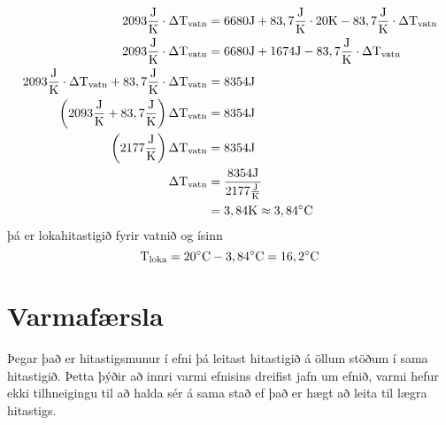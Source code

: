 \begin{formalexample}
\begin{align*}
	2093 \frac{\textrm{J}}{\text{K}} \cdot \Delta \text{T}_\text{vatn}
		&= 6680 \textrm{J} +  83,7 \frac{\textrm{J}}{\text{K}} \cdot 20 \text{K} - 83,7 \frac{\textrm{J}}{\text{K}} \cdot \Delta \text{T}_\text{vatn}\\
	2093 \frac{\textrm{J}}{\text{K}} \cdot \Delta \text{T}_\text{vatn}
		&= 6680 \textrm{J} +  1674 \textrm{J} - 83,7 \frac{\textrm{J}}{\text{K}} \cdot \Delta \text{T}_\text{vatn} \\
	2093 \frac{\textrm{J}}{\text{K}} \cdot \Delta \text{T}_\text{vatn} + 83,7 \frac{\textrm{J}}{\text{K}} \cdot \Delta \text{T}_\text{vatn}
		&= 8354 \textrm{J} \\
	\left( 2093 \frac{\textrm{J}}{\text{K}} + 83,7 \frac{\textrm{J}}{\text{K}} \right) \Delta \text{T}_\text{vatn}
		&= 8354 \textrm{J} \\
	\left( 2177 \frac{\textrm{J}}{\text{K}} \right) \Delta \text{T}_\text{vatn}
		&= 8354 \textrm{J} \\
	\Delta \text{T}_\text{vatn}
		&= \frac{8354 \textrm{J}}{ 2177 \frac{\textrm{J}}{\text{K}} } \\
		&= 3,84 \text{K} \approx 3,84 ^{\circ}\text{C}
\end{align*}
þá er lokahitastigið fyrir vatnið og ísinn
\[
	\text{T}_\text{loka} = 20 ^{\circ}\text{C} - 3,84 ^{\circ}\text{C} = 16,2 ^{\circ}\text{C}
\]
\end{formalexample}

\section{Varmafærsla}
Þegar það er hitastigsmunur í efni þá leitast hitastigið á öllum stöðum í sama
hitastigið. Þetta þýðir að innri varmi efnisins dreifist jafn um efnið, varmi
hefur ekki tilhneigingu til að halda sér á sama stað ef það er hægt að leita til
lægra hitastigs.
